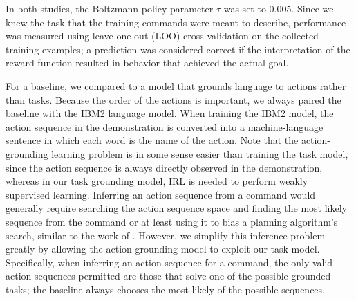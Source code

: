 \documentclass[conference]{IEEEtran}
\begin{document}

In both studies, the Boltzmann policy parameter $\tau$ was set to $0.005$. Since we knew the task that the training commands were meant to describe, performance was measured using leave-one-out (LOO) cross validation on the collected training examples; a prediction was considered correct if the interpretation of the reward function resulted in behavior that achieved the actual goal. 

For a baseline, we compared to a model that grounds language to actions rather than tasks. Because the order of the actions is important, we always paired the baseline with the IBM2 language model. When training the IBM2 model, the action sequence in the demonstration is converted into a machine-language sentence in which each word is the name of the action. Note that the action-grounding learning problem is in some sense easier than training the task model, since the action sequence is always directly observed in the demonstration, whereas in our task grounding model, IRL is needed to perform weakly supervised learning. Inferring an action sequence from a command would generally require searching the action sequence space and finding the most likely sequence from the command or at least using it to bias a planning algorithm's search, similar to the work of \citet{chen11}. However, we simplify this inference problem greatly by allowing the action-grounding model to exploit our task model. Specifically, when inferring an action sequence for a command, the only valid action sequences permitted are those that solve one of the possible grounded tasks; the baseline always chooses the most likely of the possible sequences.
\end{document}
